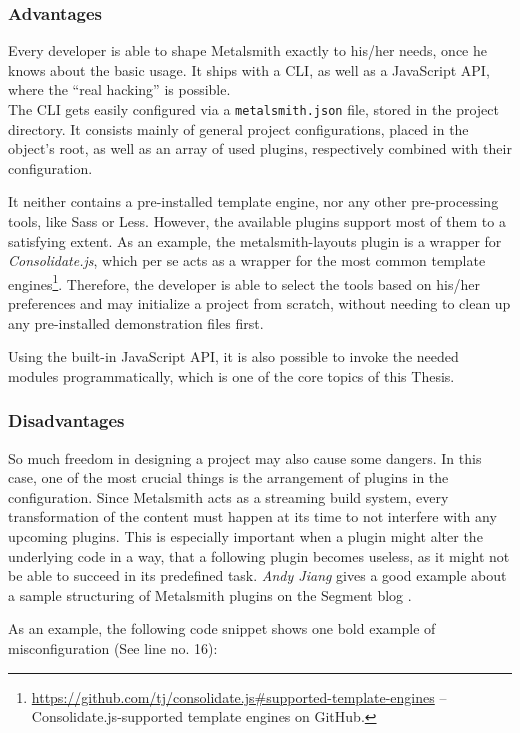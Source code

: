 \subsubsection{Advantages}
Every developer is able to shape Metalsmith exactly to his/her needs, once he knows about the basic usage. It ships with a CLI, as well as a JavaScript API, where the ``real hacking'' is possible.\\
The CLI gets easily configured via a \texttt{metalsmith.json} file, stored in the project directory. It consists mainly of general project configurations, placed in the object's root, as well as an array of used plugins, respectively combined with their configuration.

It neither contains a pre-installed template engine, nor any other pre-processing tools, like Sass or Less. However, the available plugins support most of them to a satisfying extent. As an example, the metalsmith-layouts plugin is a wrapper for \emph{Consolidate.js}, which per se acts as a wrapper for the most common template engines\footnote{\url{https://github.com/tj/consolidate.js\#supported-template-engines} -- Consolidate.js-supported template engines on GitHub.}. Therefore, the developer is able to select the tools based on his/her preferences and may initialize a project from scratch, without needing to clean up any pre-installed demonstration files first.

Using the built-in JavaScript API, it is also possible to invoke the needed modules programmatically, which is one of the core topics of this Thesis.

\subsubsection{Disadvantages}
So much freedom in designing a project may also cause some dangers. In this case, one of the most crucial things is the arrangement of plugins in the configuration. Since Metalsmith acts as a streaming build system, every transformation of the content must happen at its time to not interfere with any upcoming plugins. This is especially important when a plugin might alter the underlying code in a way, that a following plugin becomes useless, as it might not be able to succeed in its predefined task. \emph{Andy Jiang} gives a good example about a sample structuring of Metalsmith plugins on the Segment blog \cite{Metalsmith2015technicaldocumentation}.

As an example, the following code snippet shows one bold example of misconfiguration (See line no. 16):


